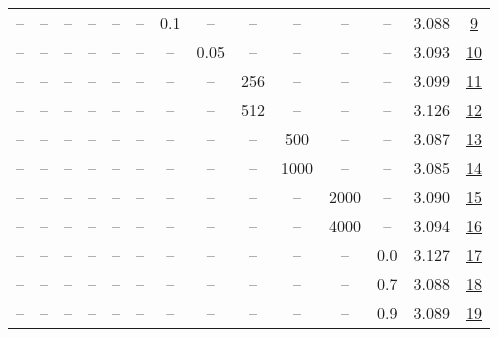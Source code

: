 \begin{table}[H]
\begin{tabular}{cccccccccccccc}
-- & -- & -- & -- & -- & -- & 0.1 & -- & -- & -- & -- & -- & 3.088 & \href{https://wandb.ai/stanford-mercury/optimizer-scaling/runs/sweep-520m-10B-kron2ec659lr0.001-wd0.5-b10.95-plr0.1-pis1-gn1-no-22bed3}{9} \\
-- & -- & -- & -- & -- & -- & -- & 0.05 & -- & -- & -- & -- & 3.093 & \href{https://wandb.ai/stanford-mercury/optimizer-scaling/runs/sweep-520m-10B-kron2f3c38lr0.001-wd0.5-b10.95-plr0.2-pis1-gn1-no-99d3a4}{10} \\
-- & -- & -- & -- & -- & -- & -- & -- & 256 & -- & -- & -- & 3.099 & \href{https://wandb.ai/stanford-mercury/optimizer-scaling/runs/sweep-520m-10B-kron798587lr0.001-wd0.5-b10.95-plr0.2-pis1-gn1-no-fcd346}{11} \\
-- & -- & -- & -- & -- & -- & -- & -- & 512 & -- & -- & -- & 3.126 & \href{https://wandb.ai/stanford-mercury/optimizer-scaling/runs/sweep-520m-10B-kron8f965elr0.001-wd0.5-b10.95-plr0.2-pis1-gn1-no-589914}{12} \\
-- & -- & -- & -- & -- & -- & -- & -- & -- & 500 & -- & -- & 3.087 & \href{https://wandb.ai/stanford-mercury/optimizer-scaling/runs/sweep-520m-10B-krona2e0delr0.001-wd0.5-b10.95-plr0.2-pis1-gn1-no-f9eafc}{13} \\
-- & -- & -- & -- & -- & -- & -- & -- & -- & 1000 & -- & -- & 3.085 & \href{https://wandb.ai/stanford-mercury/optimizer-scaling/runs/sweep-520m-10B-kron4297d5lr0.001-wd0.5-b10.95-plr0.2-pis1-gn1-no-b6a2c5}{14} \\
-- & -- & -- & -- & -- & -- & -- & -- & -- & -- & 2000 & -- & 3.090 & \href{https://wandb.ai/stanford-mercury/optimizer-scaling/runs/sweep-520m-10B-kron7f1bb9lr0.001-wd0.5-b10.95-plr0.2-pis1-gn1-no-4a18ea}{15} \\
-- & -- & -- & -- & -- & -- & -- & -- & -- & -- & 4000 & -- & 3.094 & \href{https://wandb.ai/stanford-mercury/optimizer-scaling/runs/sweep-520m-10B-krona25d57lr0.001-wd0.5-b10.95-plr0.2-pis1-gn1-no-c8cf50}{16} \\
-- & -- & -- & -- & -- & -- & -- & -- & -- & -- & -- & 0.0 & 3.127 & \href{https://wandb.ai/stanford-mercury/optimizer-scaling/runs/sweep-520m-10B-kronb94006lr0.001-wd0.0-b10.95-plr0.2-pis1-gn1-no-00711c}{17} \\
-- & -- & -- & -- & -- & -- & -- & -- & -- & -- & -- & 0.7 & 3.088 & \href{https://wandb.ai/stanford-mercury/optimizer-scaling/runs/sweep-520m-10B-kron80f4e9lr0.001-wd0.7-b10.95-plr0.2-pis1-gn1-no-a97c93}{18} \\
-- & -- & -- & -- & -- & -- & -- & -- & -- & -- & -- & 0.9 & 3.089 & \href{https://wandb.ai/stanford-mercury/optimizer-scaling/runs/sweep-520m-10B-krona7c046lr0.001-wd0.9-b10.95-plr0.2-pis1-gn1-no-e1f440}{19} \\
\bottomrule
\end{tabular}
\end{table}

